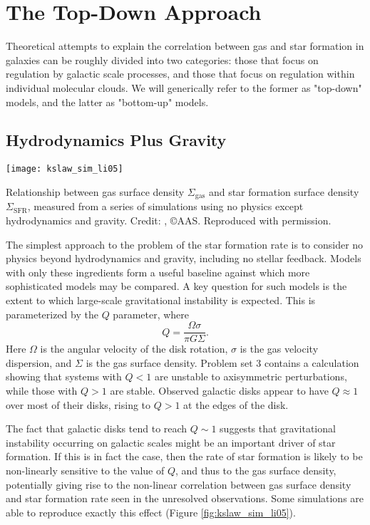 \section{The Top-Down Approach}

Theoretical attempts to explain the correlation between gas and star formation in galaxies can be roughly divided into two categories: those that focus on regulation by galactic scale processes, and those that focus on regulation within individual molecular clouds. We will generically refer to the former as "top-down" models, and the latter as "bottom-up" models.

\subsection{Hydrodynamics Plus Gravity}

\begin{marginfigure}
\texttt{[image: kslaw\_sim\_li05]}
\caption[Kennicutt-Schmidt relation from simulations with only gravity and hydrodynamics]{
\label{fig:kslaw_sim_li05}
Relationship between gas surface density $\Sigma_{\mathrm{gas}}$ and star formation surface density $\Sigma_{\mathrm{SFR}}$, measured from a series of simulations using no physics except hydrodynamics and gravity. Credit: \citet{li05a}, \copyright AAS. Reproduced with permission.
}
\end{marginfigure}

The simplest approach to the problem of the star formation rate is to consider no physics beyond hydrodynamics and gravity, including no stellar feedback. Models with only these ingredients form a useful baseline against which more sophisticated models may be compared. A key question for such models is the extent to which large-scale gravitational instability is expected. This is parameterized by the \citet{toomre64a} $Q$ parameter, where
\begin{equation}
Q = \frac{\Omega \sigma}{\pi G \Sigma}.
\end{equation}
Here $\Omega$ is the angular velocity of the disk rotation, $\sigma$ is the gas velocity dispersion, and $\Sigma$ is the gas surface density. Problem set 3 contains a calculation showing that systems with $Q < 1$ are unstable to axisymmetric perturbations, while those with $Q>1$ are stable. Observed galactic disks appear to have $Q \approx 1$ over most of their disks, rising to $Q > 1$ at the edges of the disk.

The fact that galactic disks tend to reach $Q \sim 1$ suggests that gravitational instability occurring on galactic scales might be an important driver of star formation. If this is in fact the case, then the rate of star formation is likely to be non-linearly sensitive to the value of $Q$, and thus to the gas surface density, potentially giving rise to the non-linear correlation between gas surface density and star formation rate seen in the unresolved observations. Some simulations are able to reproduce exactly this effect (Figure \ref{fig:kslaw_sim_li05}).

